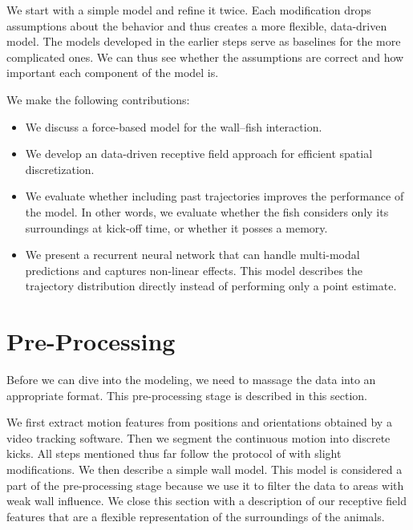 \documentclass[nobib, a4paper]{tufte-handout}
\begin{document}
We start with a simple model and refine it twice.
Each modification drops assumptions about the behavior and thus creates a more flexible, data-driven model.
The models developed in the earlier steps serve as baselines for the more complicated ones.
We can thus see whether the assumptions are correct and how important each component of the model is.

We make the following contributions:
\begin{itemize}
\item We discuss a force-based model for the wall--fish interaction.
\item We develop an data-driven receptive field approach for efficient spatial discretization.
\item We evaluate whether including past trajectories improves the performance of the model.
  In other words, we evaluate whether the fish considers only its surroundings at kick-off time, or whether it posses a memory.
\item We present a recurrent neural network that can handle multi-modal predictions and captures non-linear effects.
  This model describes the trajectory distribution directly instead of performing only a point estimate.
\end{itemize}

\section{Pre-Processing}
Before we can dive into the modeling, we need to massage the data into an appropriate format.
This pre-processing stage is described in this section.

We first extract motion features from positions and orientations obtained by a video tracking software.
Then we segment the continuous motion into discrete kicks.
All steps mentioned thus far follow the protocol of \citeauthor{calovi}\autocite{calovi} with slight modifications.
We then describe a simple wall model.
This model is considered a part of the pre-processing stage because we use it to filter the data to areas with weak wall influence.
We close this section with a description of our receptive field features that are a flexible representation of the surroundings of the animals.
\end{document}
